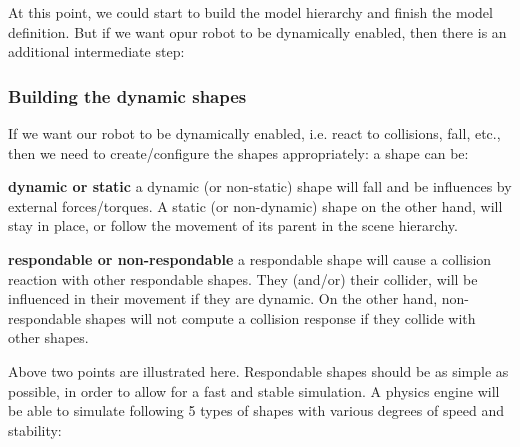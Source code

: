 
At this point, we could start to build the model hierarchy and finish the 
model definition. But if we want opur robot to be dynamically enabled, then 
there is an additional intermediate step:

\subsubsection{Building the dynamic shapes}

If we want our robot to be dynamically enabled, i.e. react to collisions, fall,
etc., then we need to create/configure the shapes appropriately: a shape can be:
\begin{description}
	\item{\textbf{dynamic or static}}
	a dynamic (or non-static) shape will fall and be influences by external
	forces/torques. A static (or non-dynamic) shape on the other hand, will 
	stay in place, or follow the movement of its parent in the scene hierarchy.
	\item{\textbf{respondable or non-respondable}}
	a respondable shape will cause a collision reaction with other respondable 
	shapes. They (and/or) their collider, will be influenced in their movement 
	if they are dynamic. On the other hand, non-respondable shapes will not 
	compute a collision response if they collide with other shapes.
\end{description}

Above two points are illustrated here. Respondable shapes should be as simple 
as possible, in order to allow for a fast and stable simulation. A physics 
engine will be able to simulate following 5 types of shapes with various 
degrees of speed and stability:

